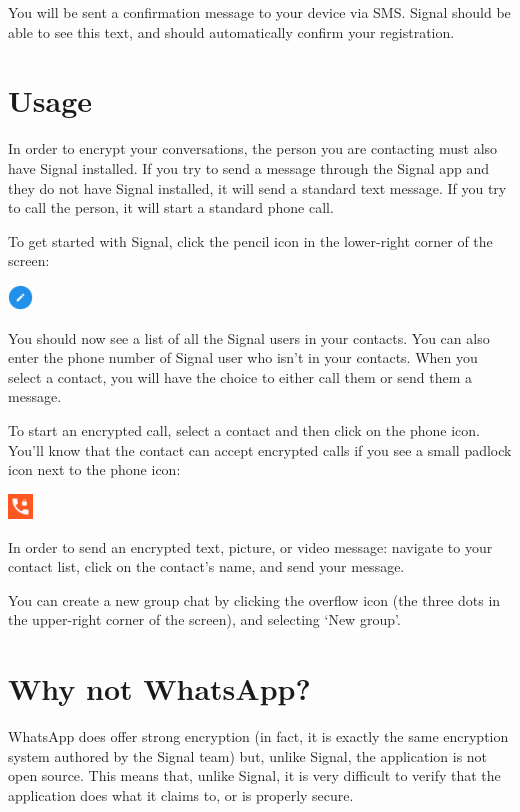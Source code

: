 \documentclass[10.5pt,a4paper]{article} %
\begin{document}
\begin{multicols*}{2}
You will be sent a confirmation message to your device via SMS. Signal should be able to see this text, and should automatically confirm your registration.


\section*{Usage}
In order to encrypt your conversations, the person you are contacting must also have Signal installed. If you try to send a message through the Signal app and they do not have Signal installed, it will send a standard text message. If you try to call the person, it will start a standard phone call.

To get started with Signal, click the pencil icon in the lower-right corner of the screen:
\begin{center}
	\includegraphics[width=0.05\textwidth]{pencil_icon.png}
\end{center}

You should now see a list of all the Signal users in your contacts. You can also enter the phone number of Signal user who isn't in your contacts. When you select a contact, you will have the choice to either call them or send them a message.

To start an encrypted call, select a contact and then click on the phone icon. You'll know that the contact can accept encrypted calls if you see a small padlock icon next to the phone icon:
\begin{center}
	\includegraphics[width=0.05\textwidth]{padlock_icon.png}
\end{center}

In order to send an encrypted text, picture, or video message: navigate to your contact list, click on the contact's name, and send your message.

You can create a new group chat by clicking the overflow icon (the three dots in the upper-right corner of the screen), and selecting `New group'.


\section*{Why not WhatsApp?}
WhatsApp does offer strong encryption (in fact, it is exactly the same encryption system authored by the Signal team) but, unlike Signal, the application is not open source. This means that, unlike Signal, it is very difficult to verify that the application does what it claims to, or is properly secure.


\end{multicols*}
\end{document}
